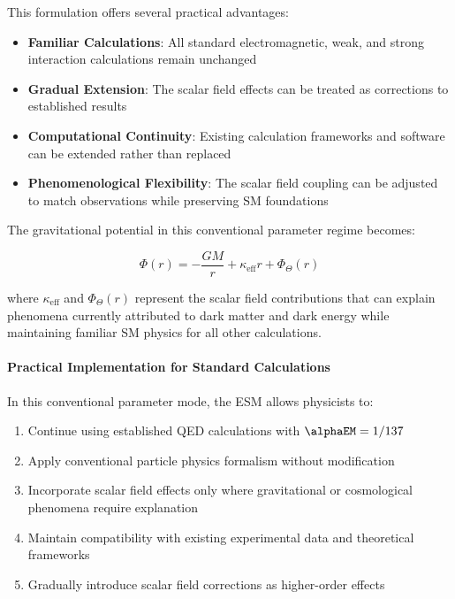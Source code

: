 	This formulation offers several practical advantages:
	
	\begin{itemize}
		\item \textbf{Familiar Calculations}: All standard electromagnetic, weak, and strong interaction calculations remain unchanged
		\item \textbf{Gradual Extension}: The scalar field effects can be treated as corrections to established results
		\item \textbf{Computational Continuity}: Existing calculation frameworks and software can be extended rather than replaced
		\item \textbf{Phenomenological Flexibility}: The scalar field coupling can be adjusted to match observations while preserving SM foundations
	\end{itemize}
	
	The gravitational potential in this conventional parameter regime becomes:
	
	\begin{equation}
		\Phi(r) = -\frac{GM}{r} + \kappa_{\text{eff}} r + \Phi_{\Theta}(r)
	\end{equation}
	
	where $\kappa_{\text{eff}}$ and $\Phi_{\Theta}(r)$ represent the scalar field contributions that can explain phenomena currently attributed to dark matter and dark energy while maintaining familiar SM physics for all other calculations.
	
	\paragraph{Practical Implementation for Standard Calculations}
	\label{par:practical_implementation}
	
	In this conventional parameter mode, the ESM allows physicists to:
	
	\begin{enumerate}
		\item Continue using established QED calculations with $\alphaEM = 1/137$
		\item Apply conventional particle physics formalism without modification
		\item Incorporate scalar field effects only where gravitational or cosmological phenomena require explanation
		\item Maintain compatibility with existing experimental data and theoretical frameworks \cite{Peskin1995}
		\item Gradually introduce scalar field corrections as higher-order effects
	\end{enumerate}
	

